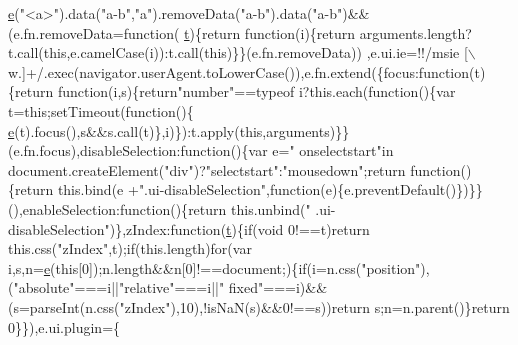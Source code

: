 \begin{DoxyCode}
      \hyperlink{jquery-ui_8min_8js_a2c038346d47955cbe2cb91e338edd7e1}{e}(\textcolor{stringliteral}{"<a>"}).data(\textcolor{stringliteral}{"a-b"},\textcolor{stringliteral}{"a"}).removeData(\textcolor{stringliteral}{"a-b"}).data(\textcolor{stringliteral}{"a-b"})&&(e.fn.removeData=\textcolor{keyword}{function}(
      \hyperlink{jquery-2_80_83_8min_8js_aaccc9105df5383111407fd5b41255e23}{t})\{\textcolor{keywordflow}{return} \textcolor{keyword}{function}(i)\{\textcolor{keywordflow}{return} arguments.length?t.call(\textcolor{keyword}{this},e.camelCase(i)):t.call(\textcolor{keyword}{this})\}\}(e.fn.removeData))
      ,e.ui.ie=!!/msie [\(\backslash\)w.]+/.exec(navigator.userAgent.toLowerCase()),e.fn.extend(\{focus:\textcolor{keyword}{function}(t)\{\textcolor{keywordflow}{return} \textcolor{keyword}{
      function}(i,s)\{\textcolor{keywordflow}{return}\textcolor{stringliteral}{"number"}==typeof i?\textcolor{keyword}{this}.each(\textcolor{keyword}{function}()\{var t=\textcolor{keyword}{this};setTimeout(\textcolor{keyword}{function}()\{
      \hyperlink{jquery-ui_8min_8js_a2c038346d47955cbe2cb91e338edd7e1}{e}(t).focus(),s&&s.call(t)\},i)\}):t.apply(\textcolor{keyword}{this},arguments)\}\}(e.fn.focus),disableSelection:\textcolor{keyword}{function}()\{var e=\textcolor{stringliteral}{"
      onselectstart"}in document.createElement(\textcolor{stringliteral}{"div"})?\textcolor{stringliteral}{"selectstart"}:\textcolor{stringliteral}{"mousedown"};\textcolor{keywordflow}{return} \textcolor{keyword}{function}()\{\textcolor{keywordflow}{return} this.bind(e
      +\textcolor{stringliteral}{".ui-disableSelection"},\textcolor{keyword}{function}(e)\{e.preventDefault()\})\}\}(),enableSelection:\textcolor{keyword}{function}()\{\textcolor{keywordflow}{return} this.unbind(\textcolor{stringliteral}{"
      .ui-disableSelection"})\},zIndex:\textcolor{keyword}{function}(\hyperlink{jquery-2_80_83_8min_8js_aaccc9105df5383111407fd5b41255e23}{t})\{\textcolor{keywordflow}{if}(\textcolor{keywordtype}{void} 0!==t)\textcolor{keywordflow}{return} this.css(\textcolor{stringliteral}{"zIndex"},t);\textcolor{keywordflow}{if}(this.length)\textcolor{keywordflow}{for}(var
       i,s,n=\hyperlink{jquery-ui_8min_8js_a2c038346d47955cbe2cb91e338edd7e1}{e}(\textcolor{keyword}{this}[0]);n.length&&n[0]!==document;)\{\textcolor{keywordflow}{if}(i=n.css(\textcolor{stringliteral}{"position"}),(\textcolor{stringliteral}{"absolute"}===i||\textcolor{stringliteral}{"relative"}===i||\textcolor{stringliteral}{"
      fixed"}===i)&&(s=parseInt(n.css(\textcolor{stringliteral}{"zIndex"}),10),!isNaN(s)&&0!==s))\textcolor{keywordflow}{return} s;n=n.parent()\}\textcolor{keywordflow}{return} 0\}\}),e.ui.plugin=\{

\end{DoxyCode}
